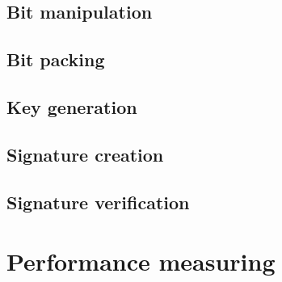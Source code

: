 \subsection{Bit manipulation}
\label{subsec:dil_bit_man}


\subsection{Bit packing}
\label{subsec:dil_bit_pack}


\subsection{Key generation}
\label{subsec:dil_keygen}


\subsection{Signature creation}
\label{subsec:dil_sign}


\subsection{Signature verification}
\label{subsec:dil_verify}


\section{Performance measuring}
\label{sec:lattice_performance_measuring}


